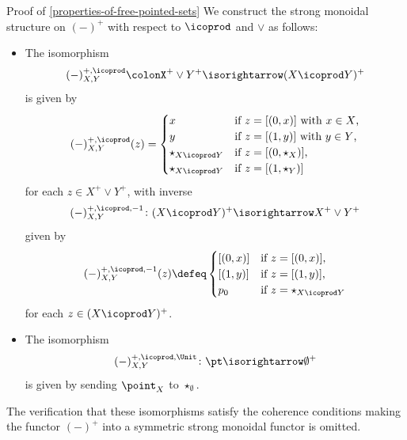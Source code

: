 \begin{Proof}{Proof of \cref{properties-of-free-pointed-sets}}
    We construct the strong monoidal structure on $(-)^{+}$ with respect to $\icoprod$ and $\vee$ as follows:
    \begin{itemize}
        \item{}The isomorphism
            \[
                (-)^{+,\icoprod}_{X,Y}%
                \colon%
                X^{+}\vee Y^{+}%
                \isorightarrow
                (X\icoprod Y)^{+}
            \]%
            is given by
            \[
                (-)^{+,\icoprod}_{X,Y}(z)%
                =%
                \begin{cases}%
                    x                   &\text{if $z=[(0,x)]$ with $x\in X$,}\\%
                    y                   &\text{if $z=[(1,y)]$ with $y\in Y$,}\\%
                    \star_{X\icoprod Y} &\text{if $z=[(0,\star_{X})]$,}\\%
                    \star_{X\icoprod Y} &\text{if $z=[(1,\star_{Y})]$}%
                \end{cases}%
            \]%
            for each $z\in X^{+}\vee Y^{+}$, with inverse
            \[
                (-)^{+,\icoprod,-1}_{X,Y}
                \colon%
                (X\icoprod Y)^{+}
                \isorightarrow
                X^{+}\vee Y^{+}%
            \]%
            given by
            \[
                (-)^{+,\icoprod,-1}_{X,Y}(z)%
                \defeq%
                \begin{cases}
                    [(0,x)] &\text{if $z=[(0,x)]$,}\\
                    [(1,y)] &\text{if $z=[(1,y)]$,}\\
                    p_{0}   &\text{if $z=\star_{X\icoprod Y}$}
                \end{cases}
            \]%
            for each $z\in(X\icoprod Y)^{+}$.
        \item{}The isomorphism
            \[
                (-)^{+,\icoprod,\Unit}_{X,Y}%
                \colon%
                \pt%
                \isorightarrow
                \emptyset^{+}%
            \]%
            is given by sending $\point_{X}$ to $\star_{\emptyset}$.
    \end{itemize}
    The verification that these isomorphisms satisfy the coherence conditions making the functor $(-)^{+}$ into a symmetric strong monoidal functor is omitted.


\end{Proof}
